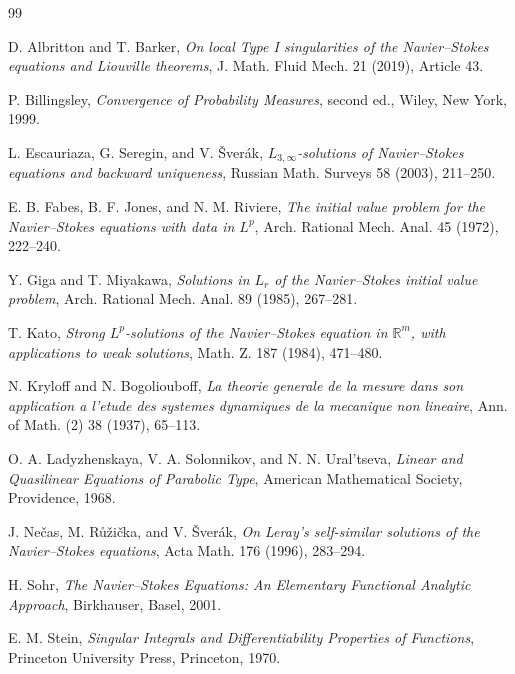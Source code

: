 \documentclass[11pt]{amsart}
\theoremstyle{plain}
\theoremstyle{definition}
\theoremstyle{remark}
\numberwithin{equation}{section}
\newcommand{\R}{\mathbb R}
\begin{document}
\begin{thebibliography}{99}

D. Albritton and T. Barker,
\emph{On local Type I singularities of the Navier--Stokes equations and
Liouville theorems},
J. Math. Fluid Mech. 21 (2019), Article 43.

P. Billingsley,
\emph{Convergence of Probability Measures}, second ed.,
Wiley, New York, 1999.

L. Escauriaza, G. Seregin, and V. \v{S}ver\'ak,
\emph{\(L_{3,\infty}\)-solutions of Navier--Stokes equations and backward
uniqueness},
Russian Math. Surveys 58 (2003), 211--250.

E. B. Fabes, B. F. Jones, and N. M. Riviere,
\emph{The initial value problem for the Navier--Stokes equations with data in
\(L^p\)},
Arch. Rational Mech. Anal. 45 (1972), 222--240.

Y. Giga and T. Miyakawa,
\emph{Solutions in \(L_r\) of the Navier--Stokes initial value problem},
Arch. Rational Mech. Anal. 89 (1985), 267--281.

T. Kato,
\emph{Strong \(L^p\)-solutions of the Navier--Stokes equation in
\(\R^m\), with applications to weak solutions},
Math. Z. 187 (1984), 471--480.

N. Kryloff and N. Bogoliouboff,
\emph{La theorie generale de la mesure dans son application a l'etude des
systemes dynamiques de la mecanique non lineaire},
Ann. of Math. (2) 38 (1937), 65--113.

O. A. Ladyzhenskaya, V. A. Solonnikov, and N. N. Ural'tseva,
\emph{Linear and Quasilinear Equations of Parabolic Type},
American Mathematical Society, Providence, 1968.

J. Ne\v{c}as, M. R\r{u}\v{z}i\v{c}ka, and V. \v{S}ver\'ak,
\emph{On Leray's self-similar solutions of the Navier--Stokes equations},
Acta Math. 176 (1996), 283--294.

H. Sohr,
\emph{The Navier--Stokes Equations: An Elementary Functional Analytic
Approach},
Birkhauser, Basel, 2001.

E. M. Stein,
\emph{Singular Integrals and Differentiability Properties of Functions},
Princeton University Press, Princeton, 1970.

\end{thebibliography}
\end{document}
